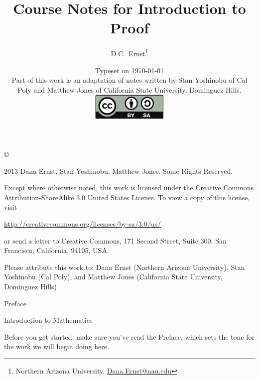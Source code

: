\documentclass[letterpaper,11pt,onesided]{book}%
\theoremstyle{problem}
\theoremstyle{definition}
\let\origdoublepage\cleardoublepage
\newcommand{\clearemptydoublepage}{%
  \clearpage
  {\pagestyle{empty}\origdoublepage}%
}
\begin{document}
\frontmatter
\title{Course Notes for Introduction to Proof}
\author{D.C.~Ernst\thanks{Northern Arizona University, \url{Dana.Ernst@nau.edu}}}
\date{Typeset on \today\\
\vfill
  Part of this work is an adaptation of notes written by Stan Yoshinobu of Cal Poly and Matthew Jones of California State University, Dominguez Hills.
\vfill
\includegraphics[height=1.3cm]{by-sa}
\vfill}
\maketitle
 \thispagestyle{empty}

\noindent\copyright{ 2013 Dana Ernst, Stan Yoshinobu, Matthew Jones.  Some Rights Reserved.\\

\bigskip

\noindent Except where otherwise noted, this work is licensed under the Creative Commons
Attribution-ShareAlike 3.0 United States License. To view a copy of
this license, visit 
\begin{center}
  \url{http://creativecommons.org/licenses/by-sa/3.0/us/}
\end{center}
or send a letter to Creative Commons, 171 Second Street, Suite 300,
San Francisco, California, 94105, USA.

\bigskip

\noindent Please attribute this work to: Dana Ernst (Northern Arizona University),  Stan Yoshinobu (Cal Poly), and Matthew Jones (California State University, Dominguez Hills)

\tableofcontents
\clearemptydoublepage

\begin{chapter}{Preface}

\end{chapter}

\clearemptydoublepage

\mainmatter

\begin{chapter}{Introduction to Mathematics}

Before you get started, make sure you've read the Preface, which sets the tone for the work we will begin doing here.



\addtocounter{theorem}{-1}


\end{chapter}}
\end{document}
